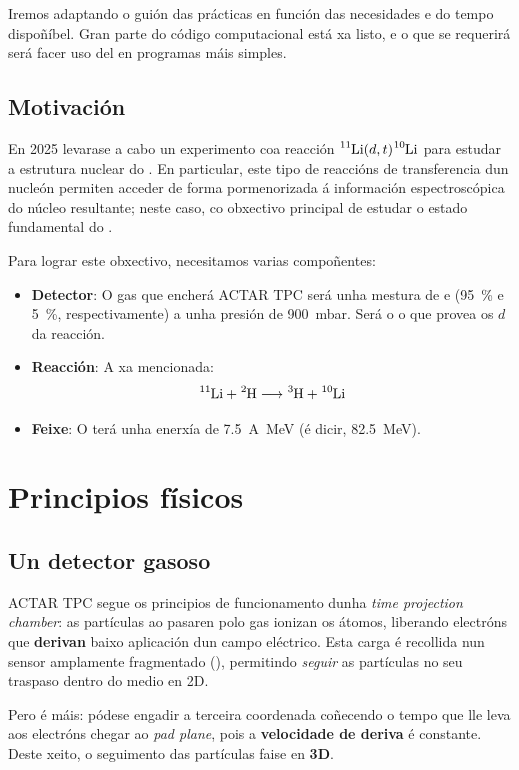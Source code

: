 \documentclass[11pt, a4paper]{article}
\newcommand{\iso}[2]{\ce{^{#1}#2}}
\begin{document}
Iremos adaptando o guión das prácticas en función das necesidades e do tempo dispoñíbel. Gran parte do código computacional está xa listo, e o que se requerirá será facer uso del en programas máis simples.

\subsection{Motivación}
En 2025 levarase a cabo un experimento coa reacción $\iso{11}{Li}(d, t)\iso{10}{Li}$ para estudar a estrutura nuclear do \iso{10}{Li}. En particular, este tipo de reaccións de transferencia dun nucleón permiten acceder de forma pormenorizada á información espectroscópica do núcleo resultante; neste caso, co obxectivo principal de estudar o estado fundamental do \iso{10}{Li}.

Para lograr este obxectivo, necesitamos varias compoñentes:
\begin{itemize}
    \item \textbf{Detector}: O gas que encherá ACTAR TPC será unha mestura de  e  (\qty{95}{\percent} e \qty{5}{\percent}, respectivamente) a unha presión de \qty{900}{\milli\bar}. Será o  o que provea os $d$ da reacción.
    \item \textbf{Reacción}: A xa mencionada:
          \begin{equation*}
              \iso{11}{Li} + \iso{2}{H} \longrightarrow \iso{3}{H} + \iso{10}{Li}
          \end{equation*}
    \item \textbf{Feixe}: O \iso{11}{Li} terá unha enerxía de \qty{7.5}{A\MeV} (é dicir, \qty{82.5}{\MeV}).
\end{itemize}

\section{Principios físicos}
\subsection{Un detector gasoso}
ACTAR TPC segue os principios de funcionamento dunha \textit{time projection chamber}: as partículas ao pasaren polo gas ionizan os átomos, liberando electróns que \textbf{derivan} baixo aplicación dun campo eléctrico. Esta carga é recollida nun sensor amplamente fragmentado (), permitindo \textit{seguir} as partículas no seu traspaso dentro do medio en 2D.

Pero é máis: pódese engadir a terceira coordenada coñecendo o tempo que lle leva aos electróns chegar ao \textit{pad plane}, pois a \textbf{velocidade de deriva} é constante. Deste xeito, o seguimento das partículas faise en \textbf{3D}.
\end{document}
